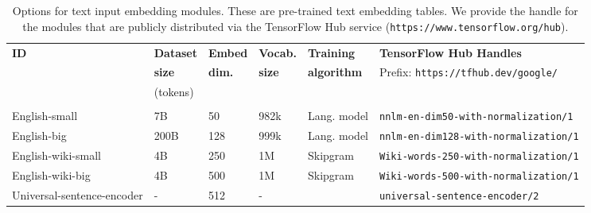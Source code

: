 \begin{table}[ht]
\centering
\begin{adjustbox}{max width=\textwidth}
\begin{tabular}{llllll}
\bf ID & \bf Dataset &\bf Embed & \bf Vocab. & \bf Training & \bf
TensorFlow Hub Handles \\
\bf  & \bf  size & \bf dim. & \bf size & \bf algorithm &
Prefix: \texttt{https://tfhub.dev/google/}\\
& (tokens) & & & \\
\hline \\
English-small  & 7B & 50 & 982k & Lang. model &
\texttt{nnlm-en-dim50-with-normalization/1} \\
English-big & 200B & 128 & 999k & Lang. model &
\texttt{nnlm-en-dim128-with-normalization/1} \\
English-wiki-small & 4B & 250 & 1M & Skipgram &
\texttt{Wiki-words-250-with-normalization/1} \\
English-wiki-big & 4B & 500 & 1M & Skipgram &
\texttt{Wiki-words-500-with-normalization/1} \\
Universal-sentence-encoder & - & 512 & - & \citep{cer2018universal} &
\texttt{universal-sentence-encoder/2} \\
\end{tabular}
\end{adjustbox}
\caption{Options for text input embedding modules.
These are pre-trained text embedding tables.
We provide the handle for the modules that are publicly distributed via the TensorFlow Hub service (\texttt{https://www.tensorflow.org/hub}).}
\label{tab:hub_embeddings_text}
\end{table}


